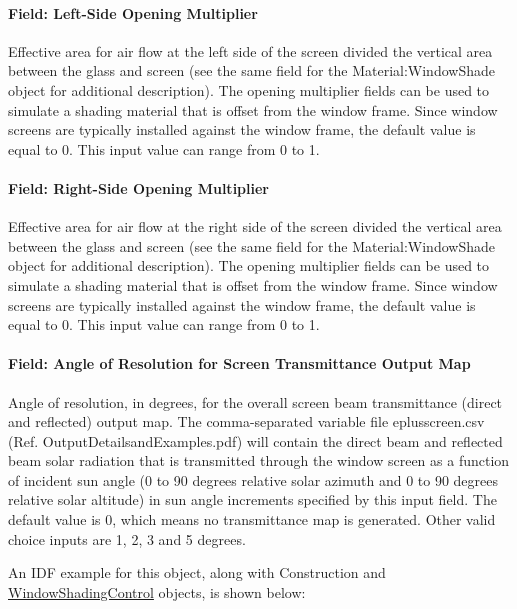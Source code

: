 \paragraph{Field: Left-Side Opening Multiplier}\label{field-left-side-opening-multiplier-2}

Effective area for air flow at the left side of the screen divided the vertical area between the glass and screen (see the same field for the Material:WindowShade object for additional description). The opening multiplier fields can be used to simulate a shading material that is offset from the window frame. Since window screens are typically installed against the window frame, the default value is equal to 0. This input value can range from 0 to 1.

\paragraph{Field: Right-Side Opening Multiplier}\label{field-right-side-opening-multiplier-2}

Effective area for air flow at the right side of the screen divided the vertical area between the glass and screen (see the same field for the Material:WindowShade object for additional description). The opening multiplier fields can be used to simulate a shading material that is offset from the window frame. Since window screens are typically installed against the window frame, the default value is equal to 0. This input value can range from 0 to 1.

\paragraph{Field: Angle of Resolution for Screen Transmittance Output Map}\label{field-angle-of-resolution-for-screen-transmittance-output-map}

Angle of resolution, in degrees, for the overall screen beam transmittance (direct and reflected) output map. The comma-separated variable file eplusscreen.csv (Ref. OutputDetailsandExamples.pdf) will contain the direct beam and reflected beam solar radiation that is transmitted through the window screen as a function of incident sun angle (0 to 90 degrees relative solar azimuth and 0 to 90 degrees relative solar altitude) in sun angle increments specified by this input field. The default value is 0, which means no transmittance map is generated. Other valid choice inputs are 1, 2, 3 and 5 degrees.

An IDF example for this object, along with Construction and \hyperref[windowpropertyshadingcontrol]{WindowShadingControl} objects, is shown below:

